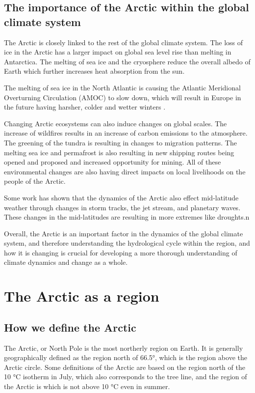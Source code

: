 \documentclass[12pt, oneside]{article}
\begin{document}



\subsection{The importance of the Arctic within the global climate system}
The Arctic is closely linked to the rest of the global climate system. The loss of ice in the Arctic has a larger impact on global sea level rise than melting in Antarctica\cite{AMAP}. The melting of sea ice and the cryosphere reduce the overall albedo of Earth which further increases heat absorption from the sun.

The melting of sea ice in the North Atlantic is causing the Atlantic Meridional Overturning Circulation (AMOC) to slow down, which will result in Europe in the future having harsher, colder and wetter winters \cite{jackson2015global}. 

Changing Arctic ecosystems can also induce changes on global scales. The increase of wildfires results in an increase of carbon emissions to the atmosphere. The greening of the tundra is resulting in changes to migration patterns. The melting sea ice and permafrost is also resulting in new shipping routes being opened and proposed and increased opportunity for mining\cite{AMAP}. All of these environmental changes are also having direct impacts on local livelihoods on the people of the Arctic.  

Some work has shown that the dynamics of the Arctic also effect mid-latitude weather through changes in storm tracks, the jet stream, and planetary waves\cite{cohen2014recent}. These changes in the mid-latitudes are resulting in more extremes like droughts.n

Overall, the Arctic is an important factor in the dynamics of the global climate system, and therefore understanding the hydrological cycle within the region, and how it is changing is crucial for developing a more thorough understanding of climate dynamics and change as a whole.

\section{The Arctic as a region}\label{arctic}
\subsection{How we define the Arctic}
The Arctic, or North Pole is the most northerly region on Earth. It is generally geographically defined as the region north of 66.5°, which is the region above the Arctic circle. Some definitions of the Arctic are based on the region north of the 10 °C isotherm in July, which also corresponds to the tree line, and the region of the Arctic is which is not above 10 °C even in summer\cite{boulder}.  
\end{document}
